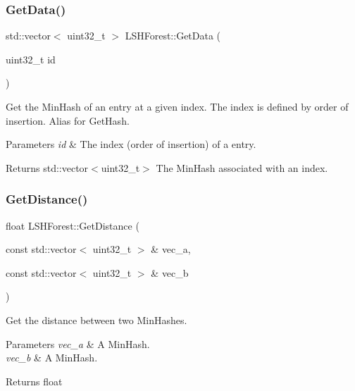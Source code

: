 \subsubsection{\texorpdfstring{Get\+Data()}{GetData()}}
{\footnotesize\ttfamily std\+::vector$<$ uint32\+\_\+t $>$ L\+S\+H\+Forest\+::\+Get\+Data (\begin{DoxyParamCaption}\item[{uint32\+\_\+t}]{id }\end{DoxyParamCaption})}



Get the Min\+Hash of an entry at a given index. The index is defined by order of insertion. Alias for Get\+Hash. 


\begin{DoxyParams}{Parameters}
{\em id} & The index (order of insertion) of a entry. \\
\hline
\end{DoxyParams}
\begin{DoxyReturn}{Returns}
std\+::vector$<$uint32\+\_\+t$>$ The Min\+Hash associated with an index. 
\end{DoxyReturn}
\mbox{\label{classLSHForest_a08d66568664bdc8e0148c18b18a1b8fa}} 
\subsubsection{\texorpdfstring{Get\+Distance()}{GetDistance()}}
{\footnotesize\ttfamily float L\+S\+H\+Forest\+::\+Get\+Distance (\begin{DoxyParamCaption}\item[{const std\+::vector$<$ uint32\+\_\+t $>$ \&}]{vec\+\_\+a,  }\item[{const std\+::vector$<$ uint32\+\_\+t $>$ \&}]{vec\+\_\+b }\end{DoxyParamCaption})}



Get the distance between two Min\+Hashes. 


\begin{DoxyParams}{Parameters}
{\em vec\+\_\+a} & A Min\+Hash. \\
\hline
{\em vec\+\_\+b} & A Min\+Hash. \\
\hline
\end{DoxyParams}
\begin{DoxyReturn}{Returns}
float 
\end{DoxyReturn}
\mbox{\label{classLSHForest_a49ad1fe0429121a8b572cde4df973d96}} 
